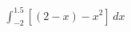 \documentclass[preview]{standalone}
\begin{document}
\begin{align*}
\int_{-2}^{1.5} [ (2 - x) - x^2 ] \, dx
\end{align*}
\end{document}
